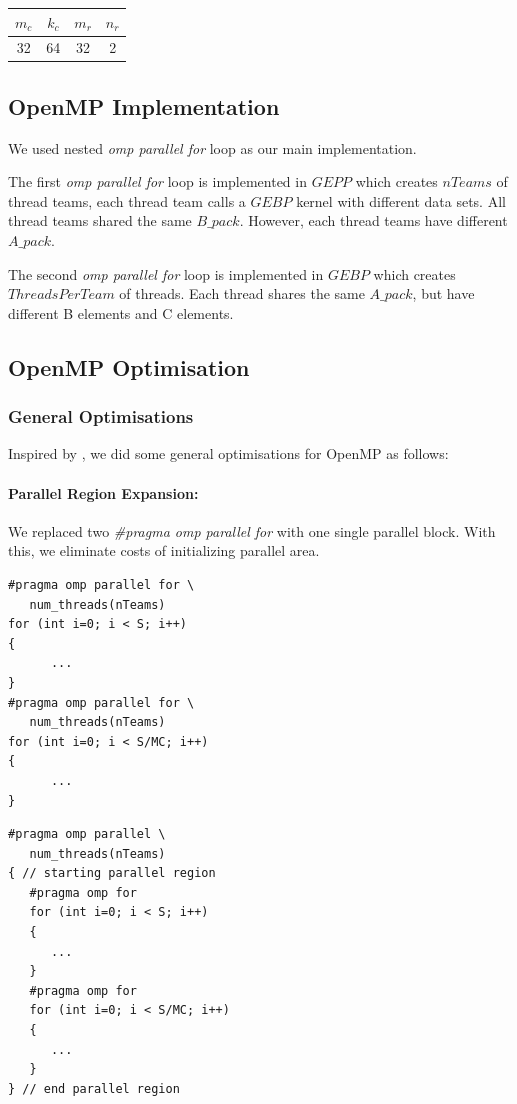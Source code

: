 \documentclass[article]{scrartcl}
\begin{document}
\begin{center}
    \begin{tabular}{|c |c| c| c | }
        \hline
        $m_c$ & $k_c$ & $m_r$ & $n_r$ \\
        \hline
        32  & 64   & 32   & 2   \\
        \hline
    \end{tabular}
\end{center}

\subsection{OpenMP Implementation}
We used nested \textit{omp parallel for} loop as our main implementation.

The first \textit{omp parallel for} loop is implemented in $GEPP$ which creates $nTeams$ of thread teams, each thread team calls a $GEBP$ kernel with different data sets. All thread teams shared the same $B\_pack$. However, each thread teams have different $A\_pack$.  

The second \textit{omp parallel for} loop is implemented in $GEBP$ which creates $ThreadsPerTeam$ of threads. Each thread shares the same $A\_pack$, but have different B elements and C elements.

\subsection{OpenMP Optimisation}

\subsubsection{General Optimisations}
Inspired by \cite{openmp1}, we did some general optimisations for OpenMP as follows:
  \paragraph{Parallel Region Expansion:}
  We replaced two \textit{\#pragma omp parallel for} with one single parallel block. With this, we eliminate costs of initializing parallel area.\\
    \begin{minipage}{.49\textwidth}
      \begin{lstlisting}[caption=Before,frame=single]
#pragma omp parallel for \
   num_threads(nTeams)
for (int i=0; i < S; i++)
{
      ...
}
#pragma omp parallel for \
   num_threads(nTeams)
for (int i=0; i < S/MC; i++)
{
      ...
}
\end{lstlisting}
\end{minipage}\hfill
\begin{minipage}{.49\textwidth}
\begin{lstlisting}[caption=Expansion of parallel region,frame=single]
#pragma omp parallel \
   num_threads(nTeams)
{ // starting parallel region
   #pragma omp for
   for (int i=0; i < S; i++)
   {
      ...
   }
   #pragma omp for
   for (int i=0; i < S/MC; i++)
   {
      ...
   }
} // end parallel region
        \end{lstlisting}
        \end{minipage}
\end{document}
